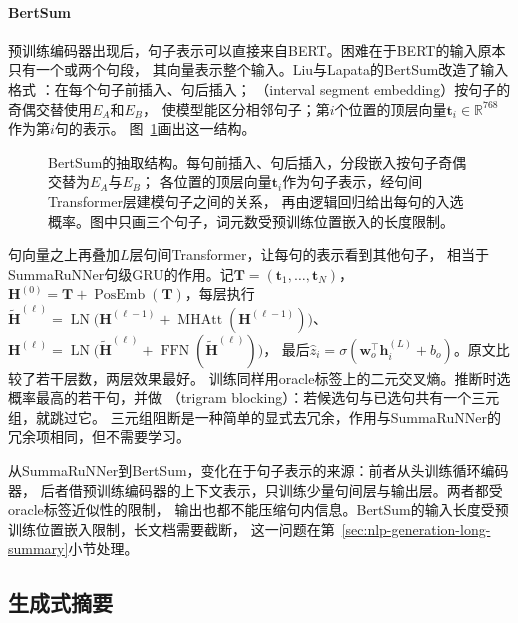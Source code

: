 \paragraph{BertSum}
预训练编码器出现后，句子表示可以直接来自BERT。困难在于BERT的输入原本只有一个或两个句段，
其\code{[CLS]}向量表示整个输入。Liu与Lapata的BertSum改造了输入格式
：在每个句子前插入\code{[CLS]}、句后插入\code{[SEP]}；
（interval segment embedding）按句子的奇偶交替使用$E_A$和$E_B$，
使模型能区分相邻句子；第$i$个\code{[CLS]}位置的顶层向量$\bm t_i\in\mathbb{R}^{768}$作为第$i$句的表示。
图~\ref{fig:nlp-generation-bertsum}画出这一结构。

\begin{figure}[htbp]
  \centering
  
  \caption{BertSum的抽取结构。每句前插入\code{[CLS]}、句后插入\code{[SEP]}，分段嵌入按句子奇偶交替为$E_A$与$E_B$；
  各\code{[CLS]}位置的顶层向量$\bm t_i$作为句子表示，经句间Transformer层建模句子之间的关系，
  再由逻辑回归给出每句的入选概率。图中只画三个句子，词元数受预训练位置嵌入的长度限制。}
  \label{fig:nlp-generation-bertsum}
\end{figure}

句向量之上再叠加$L$层句间Transformer，让每句的表示看到其他句子，
相当于SummaRuNNer句级GRU的作用。记$\bm T=(\bm t_1,\ldots,\bm t_N)$，
$\bm H^{(0)}=\bm T+\operatorname{PosEmb}(\bm T)$，每层执行
$\tilde{\bm H}^{(\ell)}=\operatorname{LN}\bigl(\bm H^{(\ell-1)}+\operatorname{MHAtt}(\bm H^{(\ell-1)})\bigr)$、
$\bm H^{(\ell)}=\operatorname{LN}\bigl(\tilde{\bm H}^{(\ell)}+\operatorname{FFN}(\tilde{\bm H}^{(\ell)})\bigr)$，
最后$\hat z_i=\sigma(\bm w_o^{\top}\bm h^{(L)}_i+b_o)$。原文比较了若干层数，两层效果最好。
训练同样用oracle标签上的二元交叉熵。推断时选概率最高的若干句，并做
（trigram blocking）：若候选句与已选句共有一个三元组，就跳过它。
三元组阻断是一种简单的显式去冗余，作用与SummaRuNNer的冗余项相同，但不需要学习。

从SummaRuNNer到BertSum，变化在于句子表示的来源：前者从头训练循环编码器，
后者借预训练编码器的上下文表示，只训练少量句间层与输出层。两者都受oracle标签近似性的限制，
输出也都不能压缩句内信息。BertSum的输入长度受预训练位置嵌入限制，长文档需要截断，
这一问题在第~\ref{sec:nlp-generation-long-summary}小节处理。

\subsection{生成式摘要}
\label{sec:nlp-generation-abstractive}

